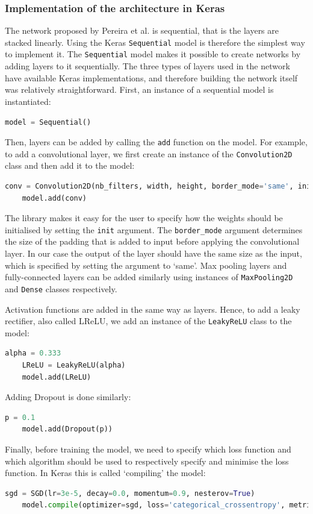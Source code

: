 \documentclass[12pt,a4paper,twoside,openright]{report}
\begin{document}
\subsubsection{Implementation of the architecture in Keras}
The network proposed by Pereira et al. is sequential, that is the layers are stacked linearly. Using the Keras \texttt{Sequential} model is therefore the simplest way to implement it. The \texttt{Sequential} model makes it possible to create networks by adding layers to it sequentially. The three types of layers used in the network have available Keras implementations, and therefore building the network itself was relatively straightforward. First, an instance of a sequential model is instantiated:
\begin{lstlisting}[language=Python]
	model = Sequential()
\end{lstlisting}
Then, layers can be added by calling the \texttt{add} function on the model. For example, to add a convolutional layer, we first create an instance of the \texttt{Convolution2D} class and then add it to the model:
\begin{lstlisting}[language=Python]
	conv = Convolution2D(nb_filters, width, height, border_mode='same', init='glorot_normal')
	model.add(conv)
\end{lstlisting}
The library makes it easy for the user to specify how the weights should be initialised by setting the \texttt{init} argument. The \texttt{border\_mode} argument determines the size of the padding that is added to input before applying the convolutional layer. In our case the output of the layer should have the same size as the input, which is specified by setting the argument to `same'. Max pooling layers and fully-connected layers can be added similarly using instances of \texttt{MaxPooling2D} and \texttt{Dense} classes respectively.

Activation functions are added in the same way as layers. Hence, to add a leaky rectifier, also called LReLU, we add an instance of the \texttt{LeakyReLU} class to the model:
\begin{lstlisting}[language=Python]
	alpha = 0.333
	LReLU = LeakyReLU(alpha)
	model.add(LReLU)
\end{lstlisting}
Adding Dropout is done similarly:
\begin{lstlisting}[language=Python]
	p = 0.1
	model.add(Dropout(p))
\end{lstlisting}

Finally, before training the model, we need to specify which loss function and which algorithm should be used to respectively specify and minimise the loss function. In Keras this is called `compiling' the model:
\begin{lstlisting}[language=Python]
	sgd = SGD(lr=3e-5, decay=0.0, momentum=0.9, nesterov=True)
	model.compile(optimizer=sgd, loss='categorical_crossentropy', metrics=['accuracy']
\end{lstlisting}
\end{document}
